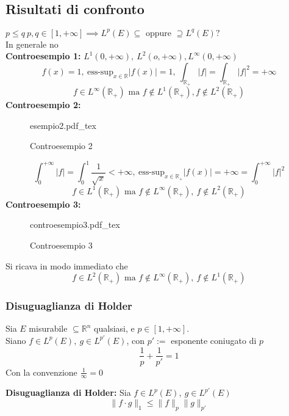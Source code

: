 \documentclass[a4paper]{article}
\newcommand{\incfig}[1]{%
	\def\svgwidth{\columnwidth}
	{#1.pdf_tex}
}
\newcommand{\R}{\mathbb{R}}
\begin{document}
\subsection{Risultati di confronto}
$p\le q\ p,q\in[1,+\infty]\implies  L^p(E)\subseteq \text{ oppure }\supseteq L^q(E)?$
\\In generale no
\\\textbf{Controesempio 1:} $L^1(0,+\infty), \ L^2(o,+\infty),L^\infty(0,+\infty)$
\[f(x)=1,\ \text{ess-sup}_{x\in\R}|f(x)|=1,\ \int_{\R_+}^{} |f|=\int_{\R_+}^{} |f|^2=+\infty\]  
\[f\in L^{\infty}(\R_+)\text{ ma }f\not\in L^1(\R_+),f\not\in L^2(\R_+)\]
\textbf{Controesempio 2:} 
\begin{figure}[ht]
    \centering
    \incfig{esempio2}
    \caption{Controesempio 2}
    \label{fig:esempio2}
\end{figure}
\[\int_{0}^{+\infty} |f|=\int_{0}^{1} \frac{1}{\sqrt{x} }<+\infty,\ \text{ess-sup}_{x\in\R_+}|f(x)|=+\infty=\int_{0}^{+\infty}|f|^2\]
\[f\in L^1(\R_+)\text{ ma }f\not\in L^\infty(\R_+),\ f\not\in L^2(\R_+)\]
\textbf{Controesempio 3:} 
\begin{figure}[ht]
    \centering
    \incfig{controesempio3}
    \caption{Controesempio 3}
    \label{fig:controesempio3}
\end{figure}
Si ricava in modo immediato che 
\[f\in L^2(\R_+)\text{ ma }f\not\in L^\infty(\R_+),\ f\not\in L^1(\R_+)\]
\subsubsection{Disuguaglianza di Holder}
\begin{tcolorbox}
	Sia $E$ misurabile $\subseteq \R^n$ qualsiasi, e $p \in [1,+\infty]$.
	\\Siano $f\in L^p(E),\ g\in L^{p'}(E)$, con $p':=$ esponente coniugato di $p$
	\[\frac{1}{p}+\frac{1}{p'}=1\]
	Con la convenzione $\frac{1}{\infty}=0$ 
\end{tcolorbox}
\begin{tcolorbox}
	\textbf{Disuguaglianza di Holder: }Sia $f\in L^p(E),\ g\in L^{p'}(E)$
	\[\|f\cdot g\|_1\le \|f\|_p\|g\|_{p'}\]
\end{tcolorbox}
\end{document}
